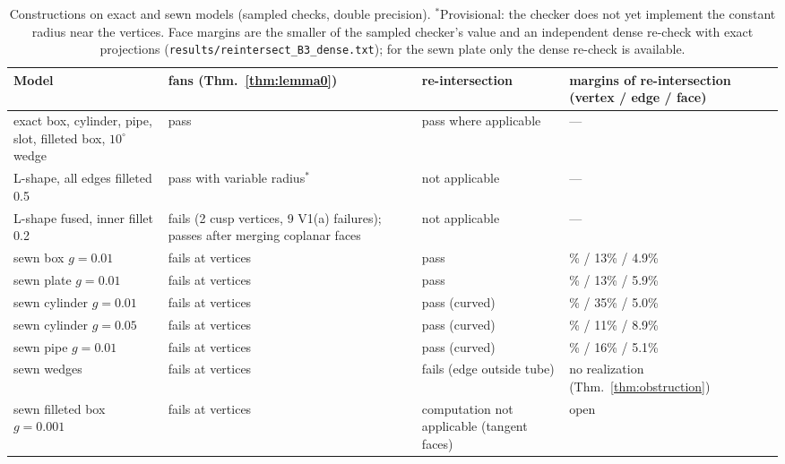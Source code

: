 \begin{table}[h]
\centering\small
\begin{tabular}{>{\raggedright}p{4.0cm}>{\raggedright}p{2.8cm}>{\raggedright}p{2.6cm}>{\raggedright\arraybackslash}p{4.0cm}}
\toprule
Model & fans (Thm.~\ref{thm:lemma0}) & re-intersection & margins of re-intersection (vertex / edge / face) \\
\midrule
exact box, cylinder, pipe, slot, filleted box, $10^\circ$ wedge & pass & pass where applicable & --- \\
L-shape, all edges filleted 0.5 & pass with variable radius$^*$ & not applicable & --- \\
L-shape fused, inner fillet 0.2 & fails (2 cusp vertices, 9 V1(a) failures); passes after merging coplanar
faces & not applicable & --- \\
sewn box $g=0.01$ & fails at vertices & pass & 45\% / 13\% / 4.9\% \\
sewn plate $g=0.01$ & fails at vertices & pass & 45\% / 13\% / 5.9\% \\
sewn cylinder $g=0.01$ & fails at vertices & pass (curved) & 55\% / 35\% / 5.0\% \\
sewn cylinder $g=0.05$ & fails at vertices & pass (curved) & 55\% / 11\% / 8.9\% \\
sewn pipe $g=0.01$ & fails at vertices & pass (curved) & 53\% / 16\% / 5.1\% \\
sewn wedges & fails at vertices & fails (edge outside tube) & no realization (Thm.~\ref{thm:obstruction}) \\
sewn filleted box $g=0.001$ & fails at vertices & computation not applicable (tangent faces) & open \\
\bottomrule
\end{tabular}
\caption{Constructions on exact and sewn models (sampled checks, double precision). $^*$Provisional: the checker
does not yet implement the constant radius near the vertices. Face margins are the smaller of the sampled checker's
value and an independent dense re-check with exact projections (\texttt{results/reintersect\_B3\_dense.txt}); for the
sewn plate only the dense re-check is available.}\label{tab:constr}
\end{table}

